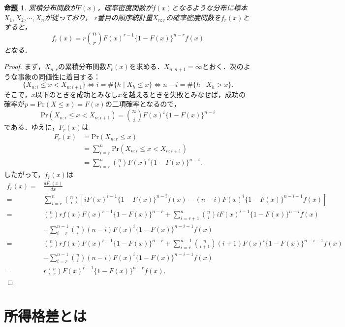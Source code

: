 \documentclass{jsarticle}
\newtheorem{prop}[dfn]{命題}
\begin{document}
\begin{prop}
累積分布関数が$F(x)$，確率密度関数が$f(x)$となるような分布に標本$X_1,X_2,\dotsb,X_n$が従っており，
$r$番目の順序統計量$X_{n:r}$の確率密度関数を$f_r(x)$とすると，
\begin{equation}
f_r(x)=r\binom{n}{r}F(x)^{r-1}\{1-F(x)\}^{n-r}f(x) \label{9}
\end{equation}
となる．
\end{prop}

\begin{proof}
まず，$X_{n:r}$の累積分布関数$F_r(x)$を求める．$X_{n:n+1}=\infty$とおく．次のような事象の同値性に着目する：
\[ \{X_{n:i}\leq x<X_{n:i+1}\} \Longleftrightarrow i=\# \{h\mid X_h\leq x\} \Longleftrightarrow n-i=\# \{h\mid X_h>x\} . \]
そこで，$x$以下のときを成功とみなし$x$を越えるときを失敗とみなせば，成功の確率が$p=\mathrm{Pr}(X\leq x)=F(x)$の二項確率となるので，
\[ \mathrm{Pr}(X_{n:i}\leq x<X_{n:i+1})=\binom{n}{i}F(x)^i\{1-F(x)\}^{n-i} \]
である．ゆえに，$F_r(x)$は
\begin{align*}
F_r(x) &=\mathrm{Pr}(X_{n:r}\leq x) \\
&=\sum_{i=r}^n \mathrm{Pr}(X_{n:i}\leq x<X_{n:i+1}) \\
&=\sum_{i=r}^n \binom{n}{i}F(x)^i\{1-F(x)\}^{n-i}.
\end{align*}
したがって，$f_r(x)$は
\begin{align*}
f_r(x)= &\frac{dF_r(x)}{dx} \\
=&\sum_{i=r}^n \binom{n}{i} [iF(x)^{i-1}\{1-F(x)\}^{n-i}f(x)-(n-i)F(x)^i\{1-F(x)\}^{n-i-1}f(x)] \\
=&\binom{n}{r} rf(x)F(x)^{r-1}\{1-F(x)\}^{n-r}+\sum_{i=r+1}^n \binom{n}{i} iF(x)^{i-1}\{1-F(x)\}^{n-i}f(x) \\
&-\sum_{i=r}^{n-1} \binom{n}{i} (n-i)F(x)^i\{1-F(x)\}^{n-i-1}f(x) \\
=&\binom{n}{r} rf(x)F(x)^{r-1}\{1-F(x)\}^{n-r}+\sum_{i=r}^{n-1} \binom{n}{i+1} (i+1)F(x)^i\{1-F(x)\}^{n-i-1}f(x) \\
&-\sum_{i=r}^{n-1} \binom{n}{i} (n-i)F(x)^i\{1-F(x)\}^{n-i-1}f(x) \\
=&r\binom{n}{r} F(x)^{r-1}\{1-F(x)\}^{n-r}f(x).
\end{align*}
\end{proof}


\section{所得格差とは} \label{syotoku}
\end{document}
